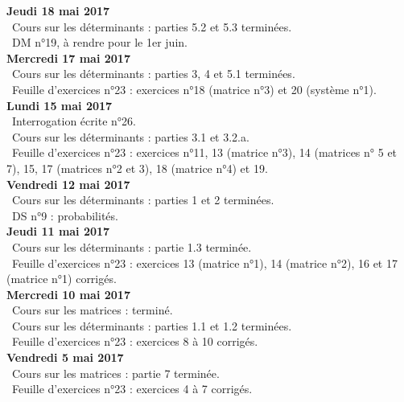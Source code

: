 \documentclass[12pt,a4paper]{article}
\begin{document}
\noindent\textbf{Jeudi 18  mai 2017}\\
\bu\ Cours sur les déterminants : parties 5.2 et 5.3 terminées.\\
\bu\ DM n°19, à rendre pour le 1er  juin.\vspace{.4cm}\\

\noindent\textbf{Mercredi 17  mai 2017}\\
\bu\ Cours sur les déterminants : parties 3, 4 et 5.1 terminées.\\
\bu\ Feuille d'exercices n°23 : exercices n°18 (matrice n°3) et 20 (système n°1).\vspace{.4cm}\\

\noindent\textbf{Lundi 15  mai 2017}\\
\bu\ Interrogation écrite n°26.\\
\bu\ Cours sur les déterminants : parties 3.1 et 3.2.a.\\
\bu\ Feuille d'exercices n°23 : exercices n°11, 13 (matrice n°3), 14 (matrices n° 5 et 7), 15, 17 (matrices n°2 et 3), 18 (matrice n°4) et 19.\vspace{.4cm}\\

\noindent\textbf{Vendredi 12  mai 2017}\\
\bu\ Cours sur les déterminants : parties 1 et 2 terminées.\\
\bu\ DS n°9 : probabilités.\vspace{.4cm}\\

\noindent\textbf{Jeudi 11 mai 2017}\\
\bu\ Cours sur les déterminants : partie 1.3 terminée.\\
\bu\ Feuille d'exercices n°23 : exercices 13 (matrice n°1), 14 (matrice n°2), 16 et 17 (matrice n°1) corrigés.\vspace{.4cm}\\

\noindent\textbf{Mercredi 10 mai 2017}\\
\bu\ Cours sur les matrices : terminé.\\
\bu\ Cours sur les déterminants : parties 1.1 et 1.2 terminées.\\
\bu\ Feuille d'exercices n°23 : exercices 8 à 10 corrigés.\vspace{.4cm}\\

\noindent\textbf{Vendredi 5 mai 2017}\\
\bu\ Cours sur les matrices : partie 7 terminée.\\
\bu\ Feuille d'exercices n°23 : exercices 4 à 7 corrigés.\vspace{.4cm}\\
\end{document}
